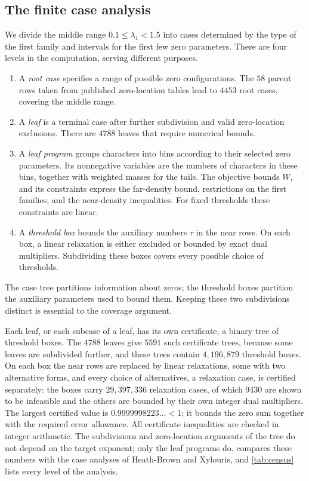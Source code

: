 \documentclass[11pt]{amsart}
\numberwithin{equation}{section}
\theoremstyle{plain}
\theoremstyle{definition}
\theoremstyle{remark}
\newcommand{\1}{\mathbf{1}}
\begin{document}
\subsection{The finite case analysis}
We divide the middle range $0.1\le\lambda_1<1.5$ into cases determined by the type of the
first family and intervals for the first few zero parameters. There are four levels in
the computation, serving different purposes.
\begin{enumerate}[(1)]
  \item A \emph{root case} specifies a range of possible zero configurations.
    The $58$ parent rows taken from published zero-location tables lead to $4453$
    root cases, covering the middle range.
  \item A \emph{leaf} is a terminal case after further subdivision and valid
    zero-location exclusions. There are $4788$ leaves that require numerical bounds.
  \item A \emph{leaf program} groups characters into bins according to their selected
    zero parameters. Its nonnegative variables are the numbers of characters in these
    bins, together with weighted masses for the tails. The objective bounds $W$, and
    its constraints express the far-density bound, restrictions on the first families,
    and the near-density inequalities. For fixed thresholds these constraints are linear.
  \item A \emph{threshold box} bounds the auxiliary numbers $\tau$ in the near rows.
    On each box, a linear relaxation is either excluded or bounded by exact dual
    multipliers. Subdividing these boxes covers every possible choice of thresholds.
\end{enumerate}
The case tree partitions information about zeros; the threshold boxes partition the
auxiliary parameters used to bound them. Keeping these two subdivisions distinct is
essential to the coverage argument.

Each leaf, or each subcase of a leaf, has its own certificate, a binary tree of threshold
boxes. The $4788$ leaves give $5591$ such certificate trees, because some leaves are
subdivided further, and these trees contain $4{,}196{,}879$ threshold boxes. On each box the near
rows are replaced by linear relaxations, some with two alternative forms, and every choice of
alternatives, a relaxation case, is certified separately: the boxes carry $29{,}397{,}336$
relaxation cases, of which $9430$ are shown to be infeasible and the others are bounded by their
own integer dual multipliers. The largest certified value is
$0.9999998223\ldots<1$; it bounds the zero sum together with the required error allowance.
All certificate inequalities are checked in integer arithmetic. The subdivisions and
zero-location arguments of the tree do not depend on the target exponent; only the leaf
programs do.  compares these numbers with the case analyses of
Heath-Brown and Xylouris, and \cref{tab:census} lists every level of the analysis.
\end{document}
